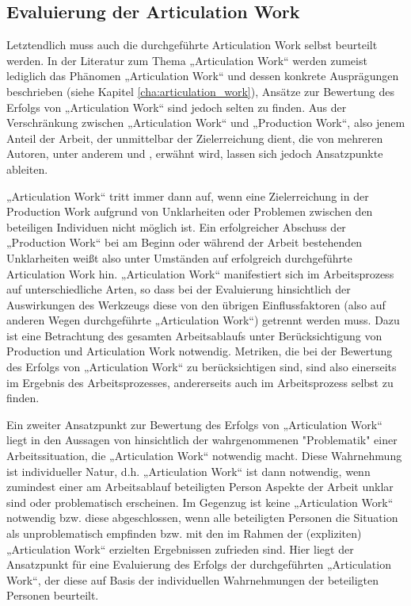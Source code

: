 \subsection{Evaluierung der Articulation Work}
\label{sub:eval_articulation_work}

Letztendlich muss auch die durchgeführte Articulation Work selbst beurteilt werden. In der Literatur zum Thema „Articulation Work“ werden zumeist lediglich das Phänomen „Articulation Work“ und dessen konkrete Ausprägungen beschrieben (siehe Kapitel \ref{cha:articulation_work}), Ansätze zur Bewertung des Erfolgs von „Articulation Work“ sind jedoch selten zu finden. Aus der Verschränkung zwischen „Articulation Work“ und „Production Work“, also jenem Anteil der Arbeit, der unmittelbar der Zielerreichung dient, die von mehreren Autoren, unter anderem \citet{Fujimura87} und \citet{Strauss93}, erwähnt wird, lassen sich jedoch Ansatzpunkte ableiten.

„Articulation Work“ tritt immer dann auf, wenn eine Zielerreichung in der Production Work aufgrund von Unklarheiten oder Problemen zwischen den beteiligen Individuen nicht möglich ist. Ein erfolgreicher Abschuss der „Production Work“ bei am Beginn oder während der Arbeit bestehenden Unklarheiten weißt also unter Umständen auf erfolgreich durchgeführte Articulation Work hin. „Articulation Work“ manifestiert sich im Arbeitsprozess auf unterschiedliche Arten, so dass bei der Evaluierung hinsichtlich der Auswirkungen des Werkzeugs diese von den übrigen Einflussfaktoren (also auf anderen Wegen durchgeführte „Articulation Work“) getrennt werden muss. Dazu ist eine Betrachtung des gesamten Arbeitsablaufs unter Berücksichtigung von Production und Articulation Work notwendig. Metriken, die bei der Bewertung des Erfolgs von „Articulation Work“ zu berücksichtigen sind, sind also einerseits im Ergebnis des Arbeitsprozesses, andererseits auch im Arbeitsprozess selbst zu finden.

Ein zweiter Ansatzpunkt zur Bewertung des Erfolgs von „Articulation Work“ liegt in den Aussagen von \citet{Strauss93} hinsichtlich der wahrgenommenen "Problematik" einer Arbeitssituation, die „Articulation Work“ notwendig macht. Diese Wahrnehmung ist individueller Natur, d.h. „Articulation Work“ ist dann notwendig, wenn zumindest einer am Arbeitsablauf beteiligten Person Aspekte der Arbeit unklar sind oder problematisch erscheinen. Im Gegenzug ist keine „Articulation Work“ notwendig bzw. diese abgeschlossen, wenn alle beteiligten Personen die Situation als unproblematisch empfinden bzw. mit den im Rahmen der (expliziten) „Articulation Work“ erzielten Ergebnissen zufrieden sind. Hier liegt der Ansatzpunkt für eine Evaluierung des Erfolgs der durchgeführten „Articulation Work“, der diese auf Basis der individuellen Wahrnehmungen der beteiligten Personen beurteilt.

